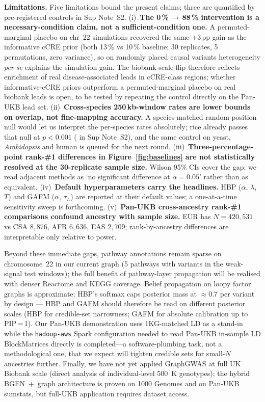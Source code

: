 \textbf{Limitations.} Five limitations bound the present claims;
three are quantified by pre-registered controls in Sup Note~S2.
(i)~\textbf{The 0\,\%\,$\to$\,88\,\% intervention is a
necessary-condition claim, not a sufficient-condition one.}
A permuted-marginal placebo on chr~22 simulations recovered the
same +3\,pp gain as the informative cCRE prior (both 13\,\% vs
10\,\% baseline; 30 replicates, 5 permutations, zero variance),
so on randomly placed causal variants heterogeneity \emph{per se}
explains the simulation gain. The biobank-scale flip therefore
reflects enrichment of real disease-associated leads in
cCRE-class regions; whether informative-cCRE priors outperform a
permuted-marginal placebo on real biobank leads is open, to be
tested by repeating the control directly on the Pan-UKB lead set.
(ii)~\textbf{Cross-species 250\,kb-window rates are lower bounds
on overlap, not fine-mapping accuracy.} A species-matched
random-position null would let us interpret the per-species rates
absolutely; rice already passes that null at $p<0.001$
( in Sup Note~S2), and the same control on
yeast, \emph{Arabidopsis} and human is queued for the next round.
(iii)~\textbf{Three-percentage-point rank-\#1 differences in
Figure~\ref{fig:baselines} are not statistically resolved at the
30-replicate sample size.} Wilson 95\% CIs cover the gap; we read
adjacent methods as `no significant difference at $\alpha = 0.05$'
rather than as equivalent.
(iv)~\textbf{Default hyperparameters carry the headlines.}
HBP ($\alpha$, $\lambda$, $T$) and GAFM ($\alpha$, $\tau_L$) are
reported at their default values; a one-at-a-time sensitivity sweep
is forthcoming.
(v)~\textbf{Pan-UKB cross-ancestry rank-\#1 comparisons confound
ancestry with sample size.} EUR has $N=420{,}531$ vs CSA $8{,}876$,
AFR $6{,}636$, EAS $2{,}709$; rank-by-ancestry differences are
interpretable only relative to power.

Beyond these immediate gaps, pathway annotations remain sparse on
chromosome~22 in our current graph (5 pathways with variants in
the weak-signal test windows); the full benefit of pathway-layer
propagation will be realised with denser Reactome\cite{gillespie2022reactome}
and KEGG\cite{kanehisa2023kegg} coverage. Belief propagation on loopy factor graphs is
approximate; HBP's softmax caps posterior mass at $\approx$0.7
per variant by design --- HBP and GAFM should therefore be read on
different posterior scales (HBP for credible-set narrowness; GAFM
for absolute calibration up to PIP\,=\,1). Our Pan-UKB demonstration uses
1KG-matched LD as a stand-in while the \texttt{hadoop-aws} Spark
configuration needed to read Pan-UKB in-sample LD BlockMatrices
directly is completed---a software-plumbing task, not a
methodological one, that we expect will tighten credible sets
for small-$N$ ancestries further. Finally, we have not yet
applied GraphGWAS at full UK Biobank scale (direct analysis of
individual-level 500~K genotypes); the hybrid BGEN~+~graph
architecture is proven on 1000 Genomes and on Pan-UKB sumstats,
but full-UKB application requires dataset access.

